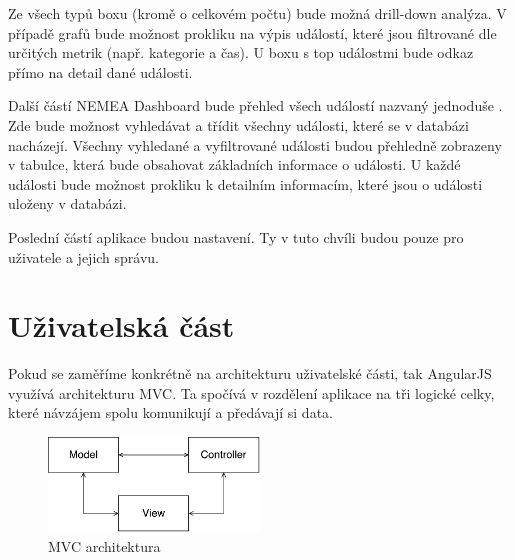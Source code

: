 Ze všech typů boxu (kromě o celkovém počtu) bude možná drill-down analýza. V případě grafů bude možnost prokliku na výpis událostí, které jsou filtrované dle určitých metrik (např. kategorie a čas). U boxu s top událostmi bude odkaz přímo na detail dané události.

Další částí NEMEA Dashboard bude přehled všech událostí nazvaný jednoduše . Zde bude možnost vyhledávat a třídit všechny události, které se v databázi nacházejí. Všechny vyhledané a vyfiltrované události budou přehledně zobrazeny v tabulce, která bude obsahovat základních informace o události. U každé události bude možnost prokliku k detailním informacím, které jsou o události uloženy v databázi.

Poslední částí aplikace budou nastavení. Ty v tuto chvíli budou pouze pro uživatele a jejich správu.

\section{Uživatelská část}
\label{sec:mvc}
Pokud se zaměříme konkrétně na architekturu uživatelské části, tak AngularJS využívá architekturu MVC. Ta spočívá v rozdělení aplikace na tři logické celky, které návzájem spolu komunikují a předávají si data.

\begin{figure}[ht]
    \centering
    \includegraphics[width=0.5\textwidth]{fig/mvc.pdf}
    \caption{MVC architektura} \label{fig:mvc}
\end{figure}

